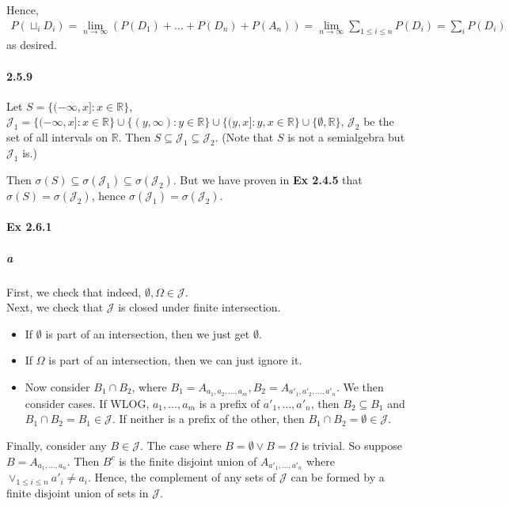 \documentclass[a4paper]{article}
\newcommand{\semialg}[0]{\mathcal{J}} %
\begin{document}
Hence, \begin{align*}
	P(\sqcup_i D_i) = \lim_{n\rightarrow \infty}(P(D_1) + \dots + P(D_n) + P(A_n)) = \lim_{n\rightarrow \infty}\sum_{1\leq i\leq n}P(D_i) = \sum_i P(D_i)
\end{align*}
as desired.

\paragraph{2.5.9} Let $S = \{(-\infty, x] : x\in\mathbb{R}\}$, $\semialg_1 = \{(-\infty, x] : x\in\mathbb{R}\}\cup\{(y,\infty):y\in\mathbb{R}\}\cup\{(y,x]:y,x\in\mathbb{R}\}\cup\{\emptyset,\mathbb{R}\}$, $\semialg_2$ be the set of all intervals on $\mathbb{R}$. Then $S\subseteq\semialg_1\subseteq\semialg_2$. (Note that $S$ is not a semialgebra but $\semialg_1$ is.)

Then $\sigma(S)\subseteq\sigma(\semialg_1)\subseteq\sigma(\semialg_2)$. But we have proven in \textbf{Ex 2.4.5} that $\sigma(S)=\sigma(\semialg_2)$, hence $\sigma(\semialg_1)=\sigma(\semialg_2)$.


\paragraph{Ex 2.6.1}
\subparagraph{a} First, we check that indeed, $\emptyset, \Omega\in\semialg$.\\
Next, we check that $\semialg$ is closed under finite intersection. 
\begin{itemize}
	\item If $\emptyset$ is part of an intersection, then we just get $\emptyset$.
	\item If $\Omega$ is part of an intersection, then we can just ignore it.
	\item Now consider $B_1\cap B_2$, where $B_1 = A_{a_1,a_2,\dots,a_m}, B_2 = A_{a'_1,a'_2,\dots,a'_n}$. We then consider cases. If WLOG, $a_1,\dots,a_m$ is a prefix of $a'_1,\dots,a'_n$, then $B_2\subseteq B_1$ and $B_1\cap B_2 = B_1\in\semialg$. If neither is a prefix of the other, then $B_1\cap B_2=\emptyset\in\semialg$.
\end{itemize}

Finally, consider any $B\in\semialg$. The case where $B=\emptyset\lor B=\Omega$ is trivial. So suppose $B = A_{a_1,\dots,a_n}$. Then $B^c$ is the finite disjoint union of $A_{a'_1,\dots,a'_n}$ where $\lor_{1\leq i\leq n} a'_i\neq a_i$. Hence, the complement of any sets of $\semialg$ can be formed by a finite disjoint union of sets in $\semialg$.
\end{document}
